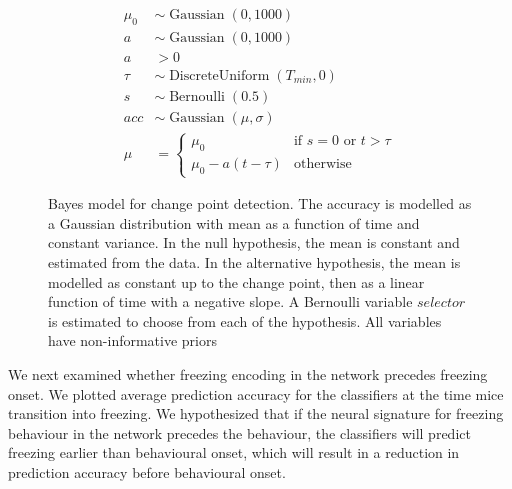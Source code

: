 \begin{figure}[h]
    \centering
    \begin{minipage}[b]{0.45\linewidth}
        
    \end{minipage}
    \begin{minipage}[b]{0.45\linewidth}
        \begin{align*}
            \mu_0 &\sim \operatorname{Gaussian}(0, 1000) \\
            a &\sim \operatorname{Gaussian}(0, 1000) \\
            a &> 0 \\
            \tau &\sim \operatorname{DiscreteUniform}(T_{min}, 0) \\
            s &\sim \operatorname{Bernoulli}(0.5) \\
            acc &\sim \operatorname{Gaussian}(\mu, \sigma) \\
            \mu &=
                \begin{cases}
                    \mu_0 & \text{if }s=0\text{ or }t>\tau \\
                    \mu_0 - a(t-\tau) & \text{otherwise}
                \end{cases}
        \end{align*}
    \end{minipage}
    \caption[Bayes model for change point detection.]{Bayes model for change point detection. The accuracy is modelled as a Gaussian distribution with mean as a function of time and constant variance. In the null hypothesis, the mean is constant and estimated from the data. In the alternative hypothesis, the mean is modelled as constant up to the change point, then as a linear function of time with a negative slope. A Bernoulli variable $selector$ is estimated to choose from each of the hypothesis. All variables have non-informative priors \label{f.ad.bayesmodel}}
\end{figure}

We next examined whether freezing encoding in the network precedes freezing onset. We plotted average prediction accuracy for the classifiers at the time mice transition into freezing. We hypothesized that if the neural signature for freezing behaviour in the network precedes the behaviour, the classifiers will predict freezing earlier than behavioural onset, which will result in a reduction in prediction accuracy before behavioural onset.

